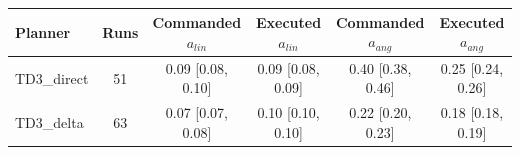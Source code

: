 \begin{tabular}{lccccc}
\midrule[1.5pt]
\textbf{Planner} & \textbf{Runs} & \textbf{Commanded $a_{lin}$} & \textbf{Executed $a_{lin}$} & \textbf{Commanded $a_{ang}$} & \textbf{Executed $a_{ang}$} \\
\midrule[1.5pt]
TD3\_direct & 51 & 0.09 [0.08, 0.10] & 0.09 [0.08, 0.09] & 0.40 [0.38, 0.46] & 0.25 [0.24, 0.26] \\
\midrule
TD3\_delta & 63 & 0.07 [0.07, 0.08] & 0.10 [0.10, 0.10] & 0.22 [0.20, 0.23] & 0.18 [0.18, 0.19] \\
\midrule[1.5pt]
\end{tabular}
